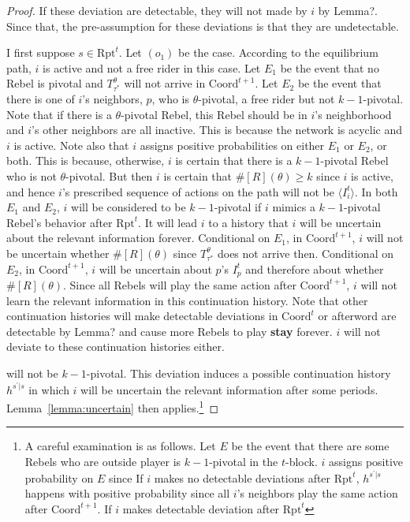 \documentclass[12pt,letter]{article}
\newcommand{\Kappa}{\mathrm{Coord}}
\newcommand{\Omicron}{\mathrm{Rpt}}
\theoremstyle{definition}
\theoremstyle{remark}
\theoremstyle{claim}
\begin{document}
\begin{proof}
If these deviation are detectable, they will not made by $i$ by Lemma?. Since that, the pre-assumption for these deviations is that they are undetectable. 

I first suppose $s\in\Omicron^t$. Let $(o_1)$ be the case. According to the equilibrium path, $i$ is active and not a free rider in this case. Let $E_1$ be the event that no Rebel is pivotal and $T^{\theta}_{\tau^{*}}$ will not arrive in $\Kappa^{t+1}$. Let $E_2$ be the event that there is one of $i$'s neighbors, $p$, who is $\theta$-pivotal, a free rider but not $k-1$-pivotal. Note that if there is a $\theta$-pivotal Rebel, this Rebel should be in $i$'s neighborhood and $i$'s other neighbors are all inactive. This is because the network is acyclic and $i$ is active. Note also that $i$ assigns positive probabilities on either $E_1$ or $E_2$, or both. This is because, otherwise, $i$ is certain that there is a $k-1$-pivotal Rebel who is not $\theta$-pivotal. But then $i$ is certain that $\#[R](\theta)\geq k$ since $i$ is active, and hence $i$'s prescribed sequence of actions on the path will not be $\langle I^{t}_i \rangle$. In both $E_1$ and $E_2$, $i$ will be considered to be $k-1$-pivotal if $i$ mimics a $k-1$-pivotal Rebel's behavior after $\Omicron^{t}$. It will lead $i$ to a history that $i$ will be uncertain about the relevant information forever. Conditional on $E_1$, in $\Kappa^{t+1}$, $i$ will not be uncertain whether $\#[R](\theta)$ since $T^{\theta}_{\tau^{*}}$ does not arrive then. Conditional on $E_2$, in $\Kappa^{t+1}$, $i$ will be uncertain about $p$'s $I^t_{p}$ and therefore about whether $\#[R](\theta)$. Since all Rebels will play the same action after $\Kappa^{t+1}$, $i$ will not learn the relevant information in this continuation history. Note that other continuation histories will make detectable deviations in $\Kappa^t$ or afterword are detectable by Lemma? and cause more Rebels to play \textbf{stay} forever. $i$ will not deviate to these continuation histories either.

will not be $k-1$-pivotal. This deviation induces a possible continuation history $h^{s^{'}|s}$ in which $i$ will be uncertain the relevant information after some periods. Lemma~\ref{lemma:uncertain} then applies.\footnote{A careful examination is as follows. Let $E$ be the event that there are some Rebels who  are outside player is $k-1$-pivotal in the $t$-block. $i$ assigns positive probability on $E$ since   If $i$ makes no detectable deviations after $\Omicron^t$, $h^{s^{'}|s}$ happens with positive probability since all $i$'s neighbors play the same action after $\Kappa^{t+1}$. If $i$ makes detectable deviation after $\Omicron^t$}
\end{proof}
\end{document}
